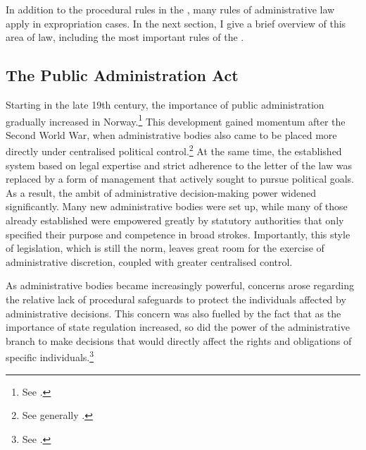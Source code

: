 
In addition to the procedural rules in the \cite{ea59}, many rules of administrative law apply in expropriation cases. In the next section, I give a brief overview of this area of law, including the most important rules of the \cite{paa67}.

\subsection{The Public Administration Act}\label{sec:paa67}

Starting in the late 19th century, the importance of public administration gradually increased in Norway.\footnote{See \cite[8-12]{nut58}.} This development gained momentum after the Second World War, when administrative bodies also came to be placed more directly under centralised political control.\footnote{See generally \cite{gronlie00}.} At the same time, the established system based on legal expertise and strict adherence to the letter of the law was replaced by a form of management that actively sought to pursue political goals. As a result, the ambit of administrative decision-making power widened significantly. Many new administrative bodies were set up, while many of those already established were empowered greatly by statutory authorities that only specified their purpose and competence in broad strokes. Importantly, this style of legislation, which is still the norm, leaves great room for the exercise of administrative discretion, coupled with greater centralised control.

As administrative bodies became increasingly powerful, concerns arose regarding the relative lack of procedural safeguards to protect the individuals affected by administrative decisions. This concern was also fuelled by the fact that as the importance of state regulation increased, so did the power of the administrative branch to make decisions that would directly affect the rights and obligations of specific individuals.\footnote{See \cite[12-16]{nut58}.}

